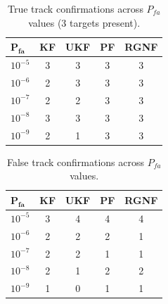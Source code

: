 %

\begin{table}[H]
    \centering
    \caption{True track confirmations across $P_{fa}$ values (3 targets present).}
    \label{tab:Ptt}
    \setlength{\tabcolsep}{3.5pt}
    \begin{tabular}{@{}lcccc@{}}
        \toprule
        $\mathbf{P_{fa}}$ & \textbf{KF} & \textbf{UKF} & \textbf{PF} & \textbf{RGNF} \\
        \midrule
        $10^{-5}$ & \cellcolor{green!20}3 & \cellcolor{green!20}3 & \cellcolor{green!20}3 & \cellcolor{green!20}3 \\
        $10^{-6}$ & 2 & \cellcolor{green!20}3 & \cellcolor{green!20}3 & \cellcolor{green!20}3 \\
        $10^{-7}$ & 2 & 2 & \cellcolor{green!20}3 & \cellcolor{green!20}3 \\
        $10^{-8}$ & \cellcolor{green!20}3 & \cellcolor{green!20}3 & \cellcolor{green!20}3 & \cellcolor{green!20}3 \\
        $10^{-9}$ & 2 & \cellcolor{red!20}1 & \cellcolor{green!20}3 & \cellcolor{green!20}3 \\
        \bottomrule
    \end{tabular}
\end{table}

\begin{table}[H]
    \centering
    \caption{False track confirmations across $P_{fa}$ values.}
    \label{tab:Pft}
    \setlength{\tabcolsep}{3.5pt}
    \begin{tabular}{@{}lcccc@{}}
        \toprule
        $\mathbf{P_{fa}}$ & \textbf{KF} & \textbf{UKF} & \textbf{PF} & \textbf{RGNF} \\
        \midrule
        $10^{-5}$ & 3 & \cellcolor{red!20}4 & \cellcolor{red!20}4 & \cellcolor{red!20}4 \\
        $10^{-6}$ & 2 & 2 & 2 & 1 \\
        $10^{-7}$ & 2 & 2 & 1 & 1 \\
        $10^{-8}$ & 2 & 1 & 2 & 2 \\
        $10^{-9}$ & 1 & \cellcolor{green!20}0 & 1 & 1 \\
        \bottomrule
    \end{tabular}
\end{table}

